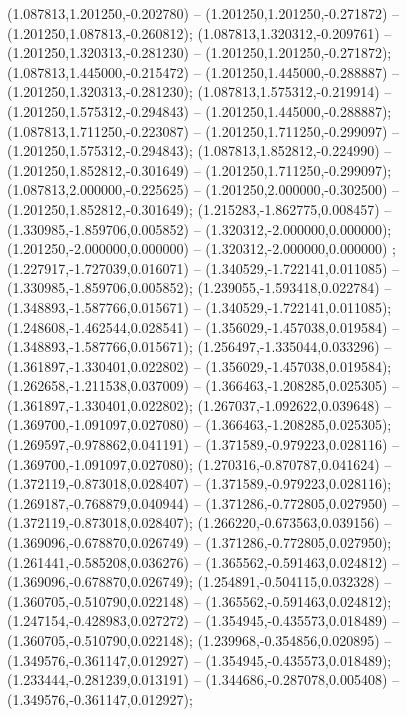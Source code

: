  (1.087813,1.201250,-0.202780) -- (1.201250,1.201250,-0.271872) -- (1.201250,1.087813,-0.260812);
 (1.087813,1.320312,-0.209761) -- (1.201250,1.320313,-0.281230) -- (1.201250,1.201250,-0.271872);
 (1.087813,1.445000,-0.215472) -- (1.201250,1.445000,-0.288887) -- (1.201250,1.320313,-0.281230);
 (1.087813,1.575312,-0.219914) -- (1.201250,1.575312,-0.294843) -- (1.201250,1.445000,-0.288887);
 (1.087813,1.711250,-0.223087) -- (1.201250,1.711250,-0.299097) -- (1.201250,1.575312,-0.294843);
 (1.087813,1.852812,-0.224990) -- (1.201250,1.852812,-0.301649) -- (1.201250,1.711250,-0.299097);
 (1.087813,2.000000,-0.225625) -- (1.201250,2.000000,-0.302500) -- (1.201250,1.852812,-0.301649);
 (1.215283,-1.862775,0.008457) -- (1.330985,-1.859706,0.005852) -- (1.320312,-2.000000,0.000000);
 (1.201250,-2.000000,0.000000) -- (1.320312,-2.000000,0.000000) ;
 (1.227917,-1.727039,0.016071) -- (1.340529,-1.722141,0.011085) -- (1.330985,-1.859706,0.005852);
 (1.239055,-1.593418,0.022784) -- (1.348893,-1.587766,0.015671) -- (1.340529,-1.722141,0.011085);
 (1.248608,-1.462544,0.028541) -- (1.356029,-1.457038,0.019584) -- (1.348893,-1.587766,0.015671);
 (1.256497,-1.335044,0.033296) -- (1.361897,-1.330401,0.022802) -- (1.356029,-1.457038,0.019584);
 (1.262658,-1.211538,0.037009) -- (1.366463,-1.208285,0.025305) -- (1.361897,-1.330401,0.022802);
 (1.267037,-1.092622,0.039648) -- (1.369700,-1.091097,0.027080) -- (1.366463,-1.208285,0.025305);
 (1.269597,-0.978862,0.041191) -- (1.371589,-0.979223,0.028116) -- (1.369700,-1.091097,0.027080);
 (1.270316,-0.870787,0.041624) -- (1.372119,-0.873018,0.028407) -- (1.371589,-0.979223,0.028116);
 (1.269187,-0.768879,0.040944) -- (1.371286,-0.772805,0.027950) -- (1.372119,-0.873018,0.028407);
 (1.266220,-0.673563,0.039156) -- (1.369096,-0.678870,0.026749) -- (1.371286,-0.772805,0.027950);
 (1.261441,-0.585208,0.036276) -- (1.365562,-0.591463,0.024812) -- (1.369096,-0.678870,0.026749);
 (1.254891,-0.504115,0.032328) -- (1.360705,-0.510790,0.022148) -- (1.365562,-0.591463,0.024812);
 (1.247154,-0.428983,0.027272) -- (1.354945,-0.435573,0.018489) -- (1.360705,-0.510790,0.022148);
 (1.239968,-0.354856,0.020895) -- (1.349576,-0.361147,0.012927) -- (1.354945,-0.435573,0.018489);
 (1.233444,-0.281239,0.013191) -- (1.344686,-0.287078,0.005408) -- (1.349576,-0.361147,0.012927);
